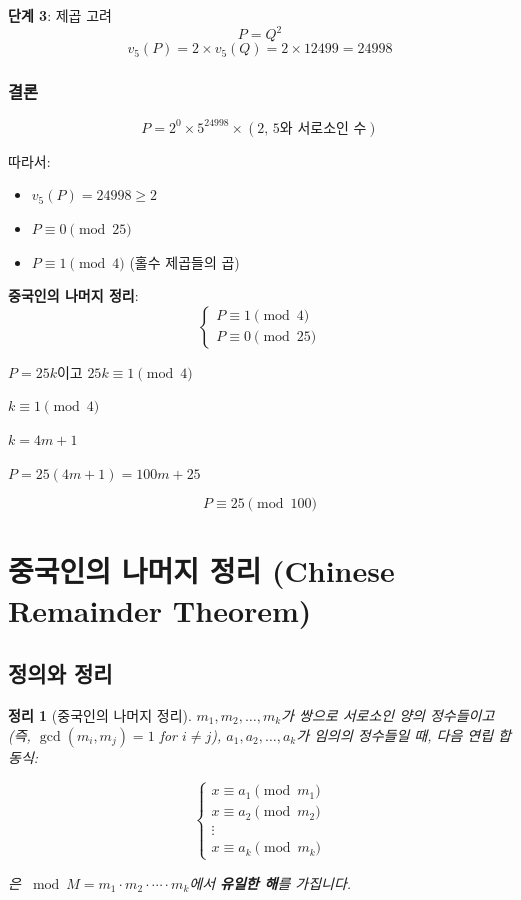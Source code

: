 \documentclass[11pt,a4paper]{article}
\newtheorem{theorem}{정리}[section]
\theoremstyle{definition}
\theoremstyle{remark}
\begin{document}
\textbf{단계 3}: 제곱 고려
\[P = Q^2\]
\[v_5(P) = 2 \times v_5(Q) = 2 \times 12499 = 24998\]

\subsubsection{결론}

\[P = 2^0 \times 5^{24998} \times (\text{2, 5와 서로소인 수})\]

따라서:
\begin{itemize}
    \item $v_5(P) = 24998 \geq 2$
    \item $P \equiv 0 \pmod{25}$
    \item $P \equiv 1 \pmod{4}$ (홀수 제곱들의 곱)
\end{itemize}

\textbf{중국인의 나머지 정리}:
\[\begin{cases}
P \equiv 1 \pmod{4} \\
P \equiv 0 \pmod{25}
\end{cases}\]

$P = 25k$이고 $25k \equiv 1 \pmod{4}$

$k \equiv 1 \pmod{4}$

$k = 4m + 1$

$P = 25(4m + 1) = 100m + 25$

\[\boxed{P \equiv 25 \pmod{100}}\]

\newpage

\section{중국인의 나머지 정리 (Chinese Remainder Theorem)}

\subsection{정의와 정리}

\begin{theorem}[중국인의 나머지 정리]
$m_1, m_2, \ldots, m_k$가 쌍으로 서로소인 양의 정수들이고 (즉, $\gcd(m_i, m_j) = 1$ for $i \neq j$),
$a_1, a_2, \ldots, a_k$가 임의의 정수들일 때, 다음 연립 합동식:

\[\begin{cases}
x \equiv a_1 \pmod{m_1} \\
x \equiv a_2 \pmod{m_2} \\
\vdots \\
x \equiv a_k \pmod{m_k}
\end{cases}\]

은 $\bmod M = m_1 \cdot m_2 \cdot \cdots \cdot m_k$에서 \textbf{유일한 해}를 가집니다.
\end{theorem}
\end{document}
